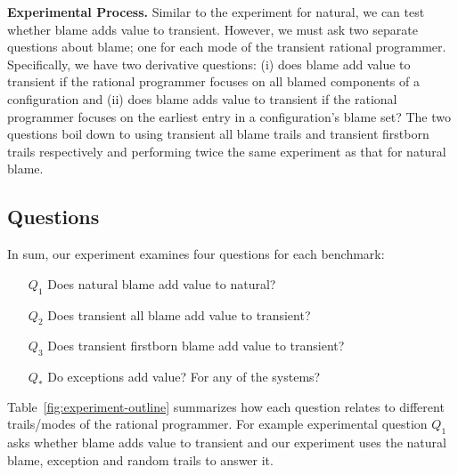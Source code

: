 \noindent
{\bf Experimental Process.} Similar to the experiment for natural, we can
test whether blame adds value to transient. However, we must ask two
separate questions about blame; one for each mode of the transient
rational programmer. Specifically, we have two derivative questions: (i)
does blame add value to transient if the rational programmer focuses on all
blamed components of a configuration and (ii) does blame adds value to
transient if the rational programmer focuses on the earliest entry in a
configuration's blame set? The two questions boil down to using 
transient all blame trails and transient
firstborn trails respectively and performing twice the same experiment as that
for natural blame. 

\subsection{Questions}

In sum, our experiment examines four questions for each benchmark:
\begin{itemize}
\item[$Q_1$] Does natural blame add value to natural?

\item[$Q_2$] Does transient all blame add value to transient?

\item[$Q_3$] Does transient firstborn blame add value to transient?

\item[$Q_*$] Do exceptions add value? For any of the systems? 
\end{itemize}

Table~\ref{fig:experiment-outline} summarizes how each question relates to
different trails/modes of the rational programmer. For example experimental
question $Q_1$ asks whether blame adds value to transient and our experiment
uses the natural blame, exception and random trails to answer it.

